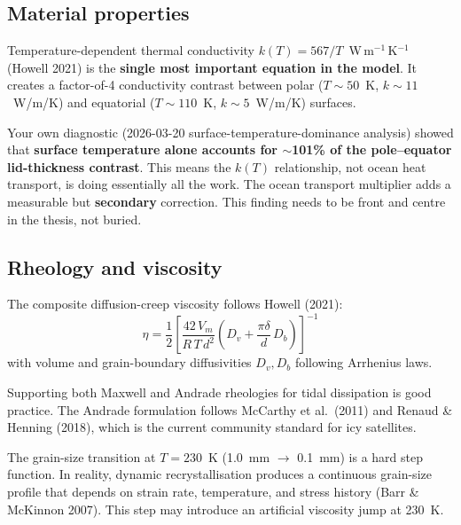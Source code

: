 \documentclass[11pt,a4paper]{article}
\begin{document}
\subsection{Material properties}

Temperature-dependent thermal conductivity $k(T) = 567/T$~W\,m$^{-1}$\,K$^{-1}$
(Howell 2021) is the \textbf{single most important equation in the model}.
It creates a factor-of-4 conductivity contrast between polar ($T \sim 50$~K,
$k \sim 11$~W/m/K) and equatorial ($T \sim 110$~K, $k \sim 5$~W/m/K) surfaces.

\begin{critical}
Your own diagnostic (2026-03-20 surface-temperature-dominance analysis)
showed that \textbf{surface temperature alone accounts for $\sim$101\% of the
pole--equator lid-thickness contrast}. This means the $k(T)$ relationship,
not ocean heat transport, is doing essentially all the work. The ocean
transport multiplier adds a measurable but \textbf{secondary} correction.
This finding needs to be front and centre in the thesis, not buried.
\end{critical}

\subsection{Rheology and viscosity}

The composite diffusion-creep viscosity follows Howell (2021):
\begin{equation}
\eta = \frac{1}{2}\left[
  \frac{42\, V_m}{R\, T\, d^2}
  \left(D_v + \frac{\pi\delta}{d}\,D_b\right)
\right]^{-1}
\label{eq:visc}
\end{equation}
with volume and grain-boundary diffusivities $D_v, D_b$ following Arrhenius
laws.

\begin{strength}
Supporting both Maxwell and Andrade rheologies for tidal dissipation is
good practice. The Andrade formulation follows McCarthy et al.\ (2011) and
Renaud \& Henning (2018), which is the current community standard for icy
satellites.
\end{strength}

\begin{warning}
The grain-size transition at $T = 230$~K (1.0~mm $\to$ 0.1~mm) is a
hard step function. In reality, dynamic recrystallisation produces a
continuous grain-size profile that depends on strain rate, temperature,
and stress history (Barr \& McKinnon 2007). This step may introduce
an artificial viscosity jump at 230~K.
\end{warning}
\end{document}
